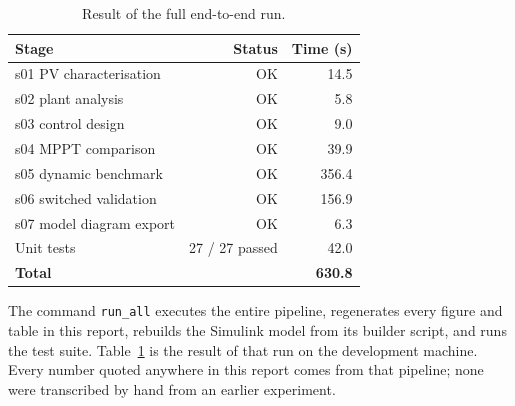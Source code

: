 \begin{table}[htbp]
\centering
\caption{Result of the full end-to-end run.}
\label{tab:runall}
\begin{tabular}{@{}lrr@{}}
\toprule
\textbf{Stage} & \textbf{Status} & \textbf{Time (\si{\second})} \\
\midrule
s01 PV characterisation   & OK   & 14.5 \\
s02 plant analysis        & OK   & 5.8 \\
s03 control design        & OK   & 9.0 \\
s04 MPPT comparison       & OK   & 39.9 \\
s05 dynamic benchmark     & OK   & 356.4 \\
s06 switched validation   & OK   & 156.9 \\
s07 model diagram export  & OK   & 6.3 \\
Unit tests                & 27 / 27 passed & 42.0 \\
\midrule
\textbf{Total}            &      & \textbf{630.8} \\
\bottomrule
\end{tabular}
\end{table}

The command \texttt{run\_all} executes the entire pipeline, regenerates every
figure and table in this report, rebuilds the Simulink model from its builder
script, and runs the test suite. Table~\ref{tab:runall} is the result of that
run on the development machine. Every number quoted anywhere in this report
comes from that pipeline; none were transcribed by hand from an earlier
experiment.
